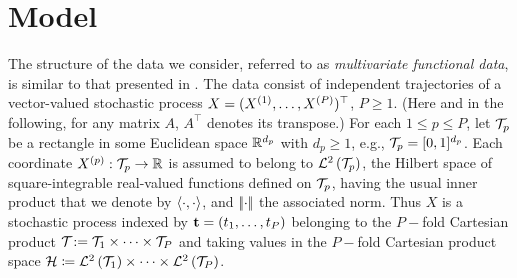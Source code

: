 \section{Model} %
\label{sec:model}

The structure of the data we consider, referred to as \emph{multivariate functional data}, is similar to that presented in \cite{happMultivariateFunctionalPrincipal2018a}. The data consist of independent trajectories of a vector-valued stochastic process $X = (X^{(1)}, \dots, X^{(P)})^\top$, $P\geq 1$. (Here and in the following, for any matrix $A$, $A^\top$ denotes its transpose.) For each $1 \leq p \leq P$, let $\mathcal{T}_{p}$ be a rectangle in some Euclidean space $\mathbb{R}^{d_p}$ with $d_p \geq 1$, e.g., $\mathcal{T}_{p} = [0,1]^{d_p}$. Each coordinate $X^{(p)} : \mathcal{T}_{p} \rightarrow \mathbb{R}$ is assumed to belong to  $\mathcal{L}^{2}\left(\mathcal{T}_{p}\right)$, the Hilbert space of square-integrable real-valued functions defined on $\mathcal{T}_{p}$, having the usual inner product that we denote by $\langle\cdot, \cdot\rangle$, and $\left|\!\left|\cdot\right|\!\right|$ the associated norm. Thus $X$ is a stochastic process indexed by $\mathbf{t} = (t_1, \ldots, t_P)$ belonging to the $P-$fold Cartesian product $\mathcal{T}_{} : =\mathcal{T}_{1} \times \cdots \times \mathcal{T}_{P}$ and taking values in the $P-$fold Cartesian product space $\mathcal{H} \coloneqq \mathcal{L}^{2}\left(\mathcal{T}_{1}\right) \times \dots \times \mathcal{L}^{2}\left(\mathcal{T}_{P}\right)$. 

